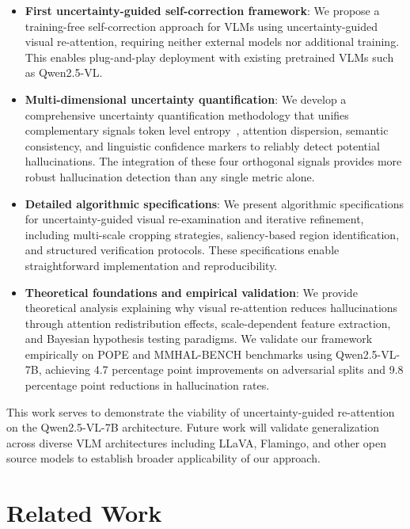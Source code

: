 \documentclass[12pt]{article}
\begin{document}
\begin{itemize}
\item \textbf{First uncertainty-guided self-correction framework}: We propose a training-free self-correction approach for VLMs using uncertainty-guided visual re-attention, requiring neither external models nor additional training. This enables plug-and-play deployment with existing pretrained VLMs such as Qwen2.5-VL.

\item \textbf{Multi-dimensional uncertainty quantification}: We develop a comprehensive uncertainty quantification methodology that unifies complementary signals token level entropy~\citep{gal2016dropout}, attention dispersion, semantic consistency, and linguistic confidence markers to reliably detect potential hallucinations. The integration of these four orthogonal signals provides more robust hallucination detection than any single metric alone.

\item \textbf{Detailed algorithmic specifications}: We present algorithmic specifications for uncertainty-guided visual re-examination and iterative refinement, including multi-scale cropping strategies, saliency-based region identification, and structured verification protocols. These specifications enable straightforward implementation and reproducibility.

\item \textbf{Theoretical foundations and empirical validation}: We provide theoretical analysis explaining why visual re-attention reduces hallucinations through attention redistribution effects, scale-dependent feature extraction, and Bayesian hypothesis testing paradigms. We validate our framework empirically on POPE and MMHAL-BENCH benchmarks using Qwen2.5-VL-7B, achieving 4.7 percentage point improvements on adversarial splits and 9.8 percentage point reductions in hallucination rates.
\end{itemize}

This work serves to demonstrate the viability of uncertainty-guided re-attention on the Qwen2.5-VL-7B architecture. Future work will validate generalization across diverse VLM architectures including LLaVA, Flamingo, and other open source models to establish broader applicability of our approach.

\section{Related Work}
\end{document}
